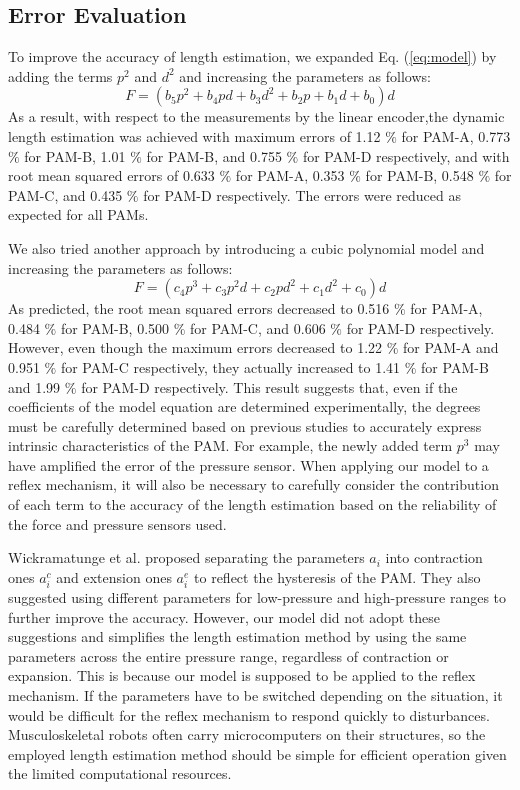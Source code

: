 \subsection{Error Evaluation}
To improve the accuracy of length estimation, we expanded Eq. (\ref{eq:model}) by adding the terms $p^2$ and $d^2$ and increasing the parameters as follows:
\begin{equation}
\label{eq:model_2d(1)}
F = (b_5p^2 + b_4pd + b_3d^2 + b_2p+b_1d+b_0)d
\end{equation}
As a result, with respect to the measurements by the linear encoder,the dynamic length estimation was achieved with maximum errors of 1.12 $\%$ for PAM-A, 0.773 $\%$ for PAM-B, 1.01 $\%$ for PAM-B, and 0.755 $\%$ for PAM-D respectively, and with root mean squared errors of 0.633 $\%$ for PAM-A, 0.353 $\%$ for PAM-B, 0.548 $\%$ for PAM-C, and 0.435 $\%$ for PAM-D respectively. The errors were reduced as expected for all PAMs. 

We also tried another approach by introducing a cubic polynomial model and increasing the parameters as follows:
\begin{equation}
    \label{eq:model_3d}
    F = (c_4p^3+c_3p^2d+c_2pd^2+c_1d^2+c_0)d
\end{equation}
As predicted, the root mean squared errors decreased to 0.516 $\%$ for PAM-A, 0.484 $\%$ for PAM-B, 0.500 $\%$ for PAM-C, and 0.606 $\%$ for PAM-D respectively. 
However, even though the maximum errors decreased to 1.22 $\%$ for PAM-A and 0.951 $\%$ for PAM-C respectively, they actually increased to 1.41 $\%$ for PAM-B and 1.99 $\%$ for PAM-D respectively. This result suggests that, even if the coefficients of the model equation are determined experimentally, the degrees must be carefully determined based on previous studies to accurately express intrinsic characteristics of the PAM. For example, the newly added term $p^3$ may have amplified the error of the pressure sensor. When applying our model to a reflex mechanism, it will also be necessary to carefully consider the contribution of each term to the accuracy of the length estimation based on the reliability of the force and pressure sensors used.


Wickramatunge et al. proposed separating the parameters $a_i$ into contraction ones $a^c_i$ and extension ones $a^e_i$ to reflect the hysteresis of the PAM\cite{spring}. They also suggested using different parameters for low-pressure and high-pressure ranges to further improve the accuracy. However, our model did not adopt these suggestions and simplifies the length estimation method by using the same parameters across the entire pressure range, regardless of contraction or expansion. This is because our model is supposed to be applied to the reflex mechanism. If the parameters have to be switched depending on the situation, it would be difficult for the reflex mechanism to respond quickly to disturbances. Musculoskeletal robots often carry microcomputers on their structures, so the employed length estimation method should be simple for efficient operation given the limited computational resources.



